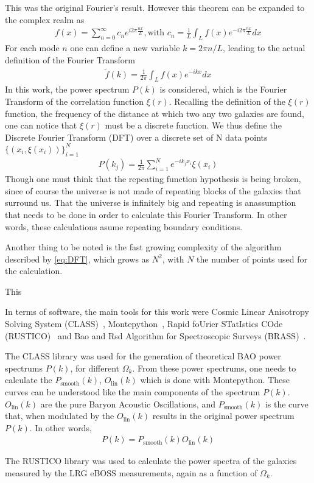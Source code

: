 This was the original Fourier's result. However this theorem can be expanded to the complex realm as 
\begin{align}
	f(x) = \sum_{n=0}^{\infty} c_n e^{i 2\pi \frac{nx}{L}}, \text{with } c_n = \frac{1}{L}\int_{L}^{} f(x) e^{-i 2\pi \frac{nx}{L}}dx 
\end{align}
For each mode $n$ one can define a new variable $k=2\pi n /L$, leading to the actual definition of the Fourier Transform 
\begin{align}
	\tilde{f}(k) = \frac{1}{2\pi}\int_{L}^{}  f(x) e^{-i k x} dx
\end{align}
In this work, the power spectrum $P(k)$ is considered, which is the Fourier Transform of the correlation function $\xi(r)$.  Recalling the definition of the $\xi(r)$ function, the frequency of the distance at which two any two galaxies are found, one can notice that  $\xi(r)$ must be a discrete function. We thus define the Discrete Fourier Transform (DFT) over a discrete set of N data points $\{\left( x_i, \xi(x_i) \right) \}_{i=1}^{N} $
\begin{align}
	P(k_j) = \frac{1}{2\pi}\sum_{i=1}^{N} e^{-i k_j x_{i}} \xi(x_i)
	\label{eq:DFT}
\end{align}
Though one must think that the repeating function hypothesis is being broken, since of course the universe is not made of repeating blocks of the galaxies that surround us. That the universe is infinitely big and repeating is anassumption that needs to be done in order to calculate this Fourier Transform. In other words, these calculations asume repeating boundary conditions.

Another thing to be noted is the fast growing complexity of the algorithm described by \eqref{eq:DFT}, which grows as $N^2$, with $N$ the number of points used for the calculation. 

This 

In terms of software, the main tools for this work were Cosmic Linear Anisotropy Solving System (CLASS)~\cite{class}, Montepython~\cite{montepython}, Rapid foUrier STatIstics COde (RUSTICO)~\cite{rustico} and Bao and Rsd Algorithm for Spectroscopic Surveys (BRASS)~\cite{brass}.

The CLASS library was used for the generation of theoretical BAO power spectrums $P(k)$, for different $\Omega_k$. From these power spectrums, one needs to calculate the $P_\text{smooth}(k)$, $O_{\text{lin}}(k)$ which is done with Montepython. These curves can be understood like the main components of the spectrum $P(k)$. $O_{\text{lin}}(k)$ are the pure Baryon Acoustic Oscillations, and $P_{\text{smooth}}(k)$ is the curve that, when modulated by the $O_{\text{lin}}(k)$ results in the original power spectrum $P(k)$. In other words, 
\begin{align}
	P(k) = P_{\text{smooth}}(k) O_{\text{lin}}(k)
\end{align}

The RUSTICO library was used to calculate the power spectra of the galaxies measured by the LRG eBOSS measurements, again as a function of $\Omega_k$.
